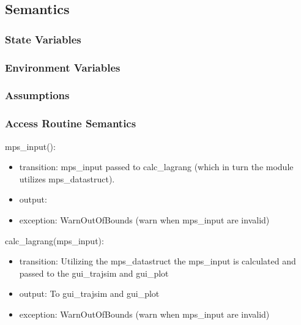 \documentclass[12pt, titlepage]{article}
\begin{document}
\subsection{Semantics}

\subsubsection{State Variables}

\subsubsection{Environment Variables}


\subsubsection{Assumptions}


\subsubsection{Access Routine Semantics}

\noindent mps\_input():
\begin{itemize}
\item transition: mps\_input passed to calc\_lagrang (which in turn the module 
utilizes mps\_datastruct).
\item output:  
\item exception: WarnOutOfBounds (warn when mps\_input are invalid) 
\end{itemize}

\noindent calc\_lagrang(mps\_input):
\begin{itemize}
\item transition: Utilizing the mps\_datastruct the mps\_input is calculated 
and passed to the gui\_trajsim and gui\_plot  
\item output: To gui\_trajsim and gui\_plot  
\item exception: WarnOutOfBounds (warn when mps\_input are invalid) 
\end{itemize}
\end{document}
